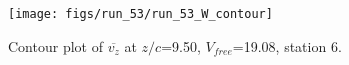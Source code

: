 \begin{figure}[H]
\centering
\texttt{[image: figs/run\_53/run\_53\_W\_contour]}
\caption{Contour plot of $\overline{v_{z}}$ at $z/c$=9.50, $V_{free}$=19.08, station 6.}
\label{fig:run_53_W_contour}
\end{figure}


